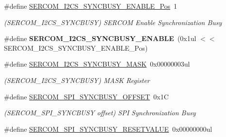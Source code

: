 \begin{DoxyCompactItemize}
\item 
\hypertarget{group___s_a_m_l21___s_e_r_c_o_m_ga62455b307f533d794fa621284bd051dc}{}\#define \hyperlink{group___s_a_m_l21___s_e_r_c_o_m_ga62455b307f533d794fa621284bd051dc}{S\+E\+R\+C\+O\+M\+\_\+\+I2\+C\+S\+\_\+\+S\+Y\+N\+C\+B\+U\+S\+Y\+\_\+\+E\+N\+A\+B\+L\+E\+\_\+\+Pos}~1\label{group___s_a_m_l21___s_e_r_c_o_m_ga62455b307f533d794fa621284bd051dc}

\begin{DoxyCompactList}\small\item\em (S\+E\+R\+C\+O\+M\+\_\+\+I2\+C\+S\+\_\+\+S\+Y\+N\+C\+B\+U\+S\+Y) S\+E\+R\+C\+O\+M Enable Synchronization Busy \end{DoxyCompactList}\item 
\hypertarget{group___s_a_m_l21___s_e_r_c_o_m_ga975023ce2e1101d4bebc87c0dd4b7a47}{}\#define {\bfseries S\+E\+R\+C\+O\+M\+\_\+\+I2\+C\+S\+\_\+\+S\+Y\+N\+C\+B\+U\+S\+Y\+\_\+\+E\+N\+A\+B\+L\+E}~(0x1ul $<$$<$ S\+E\+R\+C\+O\+M\+\_\+\+I2\+C\+S\+\_\+\+S\+Y\+N\+C\+B\+U\+S\+Y\+\_\+\+E\+N\+A\+B\+L\+E\+\_\+\+Pos)\label{group___s_a_m_l21___s_e_r_c_o_m_ga975023ce2e1101d4bebc87c0dd4b7a47}

\item 
\hypertarget{group___s_a_m_l21___s_e_r_c_o_m_ga820e506f18b103f61753e705d506c0e3}{}\#define \hyperlink{group___s_a_m_l21___s_e_r_c_o_m_ga820e506f18b103f61753e705d506c0e3}{S\+E\+R\+C\+O\+M\+\_\+\+I2\+C\+S\+\_\+\+S\+Y\+N\+C\+B\+U\+S\+Y\+\_\+\+M\+A\+S\+K}~0x00000003ul\label{group___s_a_m_l21___s_e_r_c_o_m_ga820e506f18b103f61753e705d506c0e3}

\begin{DoxyCompactList}\small\item\em (S\+E\+R\+C\+O\+M\+\_\+\+I2\+C\+S\+\_\+\+S\+Y\+N\+C\+B\+U\+S\+Y) M\+A\+S\+K Register \end{DoxyCompactList}\item 
\hypertarget{group___s_a_m_l21___s_e_r_c_o_m_ga85ba239d9a9d8934b4a3da144995d235}{}\#define \hyperlink{group___s_a_m_l21___s_e_r_c_o_m_ga85ba239d9a9d8934b4a3da144995d235}{S\+E\+R\+C\+O\+M\+\_\+\+S\+P\+I\+\_\+\+S\+Y\+N\+C\+B\+U\+S\+Y\+\_\+\+O\+F\+F\+S\+E\+T}~0x1\+C\label{group___s_a_m_l21___s_e_r_c_o_m_ga85ba239d9a9d8934b4a3da144995d235}

\begin{DoxyCompactList}\small\item\em (S\+E\+R\+C\+O\+M\+\_\+\+S\+P\+I\+\_\+\+S\+Y\+N\+C\+B\+U\+S\+Y offset) S\+P\+I Synchronization Busy \end{DoxyCompactList}\item 
\hypertarget{group___s_a_m_l21___s_e_r_c_o_m_ga701139333502231340fbd9ab6c2a2a5b}{}\#define \hyperlink{group___s_a_m_l21___s_e_r_c_o_m_ga701139333502231340fbd9ab6c2a2a5b}{S\+E\+R\+C\+O\+M\+\_\+\+S\+P\+I\+\_\+\+S\+Y\+N\+C\+B\+U\+S\+Y\+\_\+\+R\+E\+S\+E\+T\+V\+A\+L\+U\+E}~0x00000000ul\label{group___s_a_m_l21___s_e_r_c_o_m_ga701139333502231340fbd9ab6c2a2a5b}


\end{DoxyCompactItemize}
